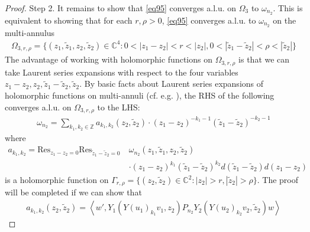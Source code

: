 \documentclass[11pt,b5paper,notitlepage]{article}
\theoremstyle{definition}
\theoremstyle{plain}
\newcommand{\wtd}{\widetilde}
\newcommand{\Res}{\mathrm{Res}}
\newcommand{\Cbb}{\mathbb C}
\newcommand{\Zbb}{\mathbb Z}
\newcommand{\<}{\left\langle}
\renewcommand{\>}{\right\rangle}
\numberwithin{equation}{section}
\begin{document}
\begin{proof}
Step 2. It remains to show that \eqref{eq95} converges a.l.u. on $\Omega_3$ to $\omega_{n_2}$. This is equivalent to showing that for each $r,\rho>0$, \eqref{eq95} converges a.l.u. to $\omega_{n_2}$ on the multi-annulus
\begin{align}
\Omega_{3,r,\rho}=\{(z_1,\wtd z_1,z_2,\wtd z_2)\in\Cbb^4:0<|z_1-z_2|<r<|z_2|,0<|\wtd z_1-\wtd z_2|<\rho<|\wtd z_2|\}
\end{align}
The advantage of working with holomorphic functions on $\Omega_{3,r,\rho}$ is that we can take Laurent series expansions with respect to the four variables $z_1-z_2,z_2,\wtd z_1-\wtd z_2,\wtd z_2$. By basic facts about Laurent series expansions of holomorphic functions on multi-annuli (cf. e.g. \cite[Lem. 7.13]{GuiLec}), the RHS of the following converges a.l.u. on $\Omega_{3,r,\rho}$ to the LHS:
\begin{align*}
\omega_{n_2}=\sum_{k_1,k_2\in\Zbb} a_{k_1,k_2}(z_2,\wtd z_2)\cdot (z_1-z_2)^{-k_1-1}(\wtd z_1-\wtd z_2)^{-k_2-1}
\end{align*}
where
\begin{align*}
a_{k_1,k_2}=\Res_{z_1-z_2=0}\Res_{\wtd z_1-\wtd z_2=0}~&\omega_{n_2}(z_1,\wtd z_1,z_2,\wtd z_2)\\
&\cdot (z_1-z_2)^{k_1}(\wtd z_1-\wtd z_2)^{k_2}d(\wtd z_1-\wtd z_2)d(z_1-z_2)
\end{align*}
is a holomorphic function on $\Gamma_{r,\rho}=\{(z_2,\wtd z_2)\in\Cbb^2:|z_2|>r,|\wtd z_2|>\rho\}$. The proof will be completed if we can show that
\begin{align}
a_{k_1,k_2}(z_2,\wtd z_2)=\<w',Y_1(Y(u_1)_{k_1}v_1,z_2)P_{n_2}Y_2(Y(u_2)_{k_2}v_2,\wtd z_2)w\>  \label{eq97}
\end{align}



\end{proof}
\end{document}
